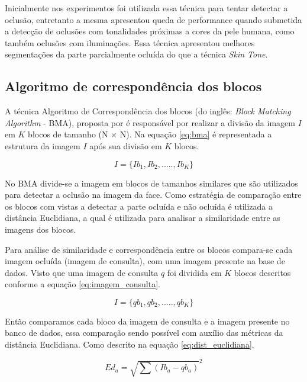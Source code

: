 Inicialmente nos experimentos foi utilizada essa técnica para tentar detectar a oclusão, entretanto a mesma apresentou queda de performance quando submetida a detecção de oclusões com tonalidades próximas a cores da pele humana, como também oclusões com iluminações. Essa técnica apresentou melhores segmentações da parte parcialmente ocluída do que a técnica \textit{Skin Tone}.


\subsection{Algoritmo de correspondência dos blocos}

A técnica Algoritmo de Correspondência dos blocos (do inglês: \textit{Block Matching Algorithm} - BMA),  proposta por \cite{[20]shermina2012recognition} é responsável por realizar a divisão da imagem $I$ em $K$ blocos de tamanho (N $\times$ N). Na equação \ref{eq:bma} é representada a estrutura da imagem $I$ após sua divisão em $K$ blocos.

\begin{equation}
\label{eq:bma}
I = \{Ib_1, Ib_2,.....,Ib_{K} \}
\end{equation}

No BMA divide-se a imagem em blocos de tamanhos similares que são utilizados para detectar a oclusão na imagem da face. Como estratégia de comparação entre os blocos com vistas a detectar a parte ocluída e não ocluída é utilizada a distância Euclidiana, a qual é utilizada para analisar a similaridade entre as imagens dos blocos.

Para análise de similaridade e correspondência entre os blocos compara-se cada imagem ocluída (imagem de consulta), com uma imagem presente na base de dados. Visto que uma imagem de consulta $q$ foi dividida em $K$ blocos descritos conforme a  equação \ref{eq:imagem_consulta}.

\begin{equation}
\label{eq:imagem_consulta}
I = \{qb_1, qb_2,.....,qb_{K} \}
\end{equation}

Então comparamos cada bloco da imagem de consulta e a imagem presente no banco de dados, essa comparação sendo possível com auxílio das métricas da distância Euclidiana. Como descrito na equação \ref{eq:dist_euclidiana}.

\begin{equation}
\label{eq:dist_euclidiana}
Ed_a = \sqrt{\sum (Ib_a - qb_a)}^2
\end{equation}



